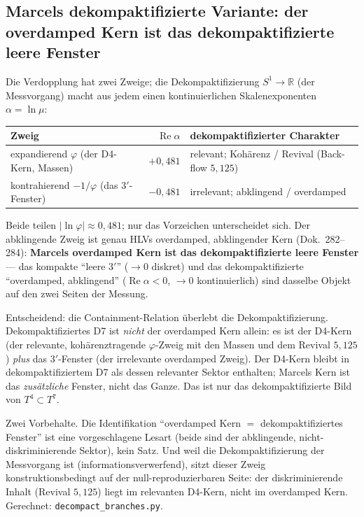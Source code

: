\subsection{Marcels dekompaktifizierte Variante: der overdamped Kern ist das dekompaktifizierte leere Fenster}
Die Verdopplung hat zwei Zweige; die Dekompaktifizierung $S^1\to\mathbb{R}$ (der Messvorgang)
macht aus jedem einen kontinuierlichen Skalenexponenten $\alpha=\ln\mu$:
\begin{center}\small\renewcommand{\arraystretch}{1.15}
\begin{tabular}{@{}l r l@{}}
\toprule
Zweig & $\operatorname{Re}\alpha$ & dekompaktifizierter Charakter \\
\midrule
expandierend $\varphi$ (der D4-Kern, Massen) & $+0{,}481$ & relevant; Koh\"arenz / Revival (Back-flow $5{,}125$) \\
kontrahierend $-1/\varphi$ (das $3'$-Fenster) & $-0{,}481$ & irrelevant; abklingend / overdamped \\
\bottomrule
\end{tabular}
\end{center}
\noindent Beide teilen $|\ln\varphi|\approx0{,}481$; nur das Vorzeichen unterscheidet sich. Der
abklingende Zweig ist genau HLVs overdamped, abklingender Kern (Dok.~282--284):
\textbf{Marcels overdamped Kern ist das dekompaktifizierte leere Fenster} --- das kompakte
\enquote{leere $3'$} ($\to0$ diskret) und das dekompaktifizierte \enquote{overdamped, abklingend}
($\operatorname{Re}\alpha<0$, $\to0$ kontinuierlich) sind dasselbe Objekt auf den zwei Seiten der
Messung.

Entscheidend: die Containment-Relation \"uberlebt die Dekompaktifizierung. Dekompaktifiziertes D7
ist \emph{nicht} der overdamped Kern allein: es ist der D4-Kern (der relevante, koh\"arenztragende
$\varphi$-Zweig mit den Massen und dem Revival $5{,}125$) \emph{plus} das $3'$-Fenster (der
irrelevante overdamped Zweig). Der D4-Kern bleibt in dekompaktifiziertem D7 als dessen relevanter
Sektor enthalten; Marcels Kern ist das \emph{zus\"atzliche} Fenster, nicht das Ganze. Das ist nur
das dekompaktifizierte Bild von $T^4\subset T^7$.

Zwei Vorbehalte. Die Identifikation \enquote{overdamped Kern $=$ dekompaktifiziertes Fenster} ist
eine vorgeschlagene Lesart (beide sind der abklingende, nicht-diskriminierende Sektor), kein Satz.
Und weil die Dekompaktifizierung der Messvorgang ist (informationsverwerfend), sitzt dieser Zweig
konstruktionsbedingt auf der null-reproduzierbaren Seite: der diskriminierende Inhalt (Revival
$5{,}125$) liegt im relevanten D4-Kern, nicht im overdamped Kern. Gerechnet:
\texttt{decompact\_branches.py}.

